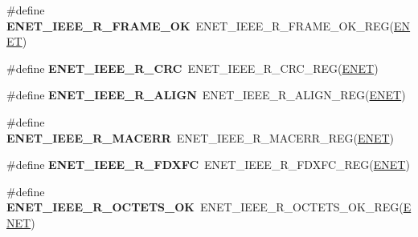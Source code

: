 \begin{DoxyCompactItemize}
\item 
\#define {\bfseries E\+N\+E\+T\+\_\+\+I\+E\+E\+E\+\_\+\+R\+\_\+\+F\+R\+A\+M\+E\+\_\+\+OK}~E\+N\+E\+T\+\_\+\+I\+E\+E\+E\+\_\+\+R\+\_\+\+F\+R\+A\+M\+E\+\_\+\+O\+K\+\_\+\+R\+EG(\hyperlink{group__ENET__Peripheral__Access__Layer_ga4745105f505f3ab949d6a57fbe2a0ed5}{E\+N\+ET})\hypertarget{group__ENET__Register__Accessor__Macros_ga8dec0614e17f4be2b36f2ed6c68695ef}{}\label{group__ENET__Register__Accessor__Macros_ga8dec0614e17f4be2b36f2ed6c68695ef}

\item 
\#define {\bfseries E\+N\+E\+T\+\_\+\+I\+E\+E\+E\+\_\+\+R\+\_\+\+C\+RC}~E\+N\+E\+T\+\_\+\+I\+E\+E\+E\+\_\+\+R\+\_\+\+C\+R\+C\+\_\+\+R\+EG(\hyperlink{group__ENET__Peripheral__Access__Layer_ga4745105f505f3ab949d6a57fbe2a0ed5}{E\+N\+ET})\hypertarget{group__ENET__Register__Accessor__Macros_ga517e6963ed94b067d5820f77694f9fb5}{}\label{group__ENET__Register__Accessor__Macros_ga517e6963ed94b067d5820f77694f9fb5}

\item 
\#define {\bfseries E\+N\+E\+T\+\_\+\+I\+E\+E\+E\+\_\+\+R\+\_\+\+A\+L\+I\+GN}~E\+N\+E\+T\+\_\+\+I\+E\+E\+E\+\_\+\+R\+\_\+\+A\+L\+I\+G\+N\+\_\+\+R\+EG(\hyperlink{group__ENET__Peripheral__Access__Layer_ga4745105f505f3ab949d6a57fbe2a0ed5}{E\+N\+ET})\hypertarget{group__ENET__Register__Accessor__Macros_ga3deebba7193f28275cb1598150dc3c91}{}\label{group__ENET__Register__Accessor__Macros_ga3deebba7193f28275cb1598150dc3c91}

\item 
\#define {\bfseries E\+N\+E\+T\+\_\+\+I\+E\+E\+E\+\_\+\+R\+\_\+\+M\+A\+C\+E\+RR}~E\+N\+E\+T\+\_\+\+I\+E\+E\+E\+\_\+\+R\+\_\+\+M\+A\+C\+E\+R\+R\+\_\+\+R\+EG(\hyperlink{group__ENET__Peripheral__Access__Layer_ga4745105f505f3ab949d6a57fbe2a0ed5}{E\+N\+ET})\hypertarget{group__ENET__Register__Accessor__Macros_ga4d4f33d57b7f466b4ce6d2ebb575fc9f}{}\label{group__ENET__Register__Accessor__Macros_ga4d4f33d57b7f466b4ce6d2ebb575fc9f}

\item 
\#define {\bfseries E\+N\+E\+T\+\_\+\+I\+E\+E\+E\+\_\+\+R\+\_\+\+F\+D\+X\+FC}~E\+N\+E\+T\+\_\+\+I\+E\+E\+E\+\_\+\+R\+\_\+\+F\+D\+X\+F\+C\+\_\+\+R\+EG(\hyperlink{group__ENET__Peripheral__Access__Layer_ga4745105f505f3ab949d6a57fbe2a0ed5}{E\+N\+ET})\hypertarget{group__ENET__Register__Accessor__Macros_gac3b1be1bb00c5beae0960855d0a8920d}{}\label{group__ENET__Register__Accessor__Macros_gac3b1be1bb00c5beae0960855d0a8920d}

\item 
\#define {\bfseries E\+N\+E\+T\+\_\+\+I\+E\+E\+E\+\_\+\+R\+\_\+\+O\+C\+T\+E\+T\+S\+\_\+\+OK}~E\+N\+E\+T\+\_\+\+I\+E\+E\+E\+\_\+\+R\+\_\+\+O\+C\+T\+E\+T\+S\+\_\+\+O\+K\+\_\+\+R\+EG(\hyperlink{group__ENET__Peripheral__Access__Layer_ga4745105f505f3ab949d6a57fbe2a0ed5}{E\+N\+ET})\hypertarget{group__ENET__Register__Accessor__Macros_ga403d0f99ada0b01ac91b2a422b434f2e}{}\label{group__ENET__Register__Accessor__Macros_ga403d0f99ada0b01ac91b2a422b434f2e}


\end{DoxyCompactItemize}
